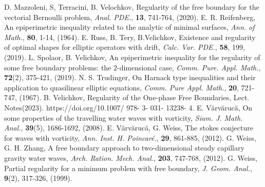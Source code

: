 \documentclass[11pt,reqno]{amsart}
\begin{document}
\begin{thebibliography}{60}
	 D. Mazzoleni, S, Terracini, B. Velochkov, \newblock  Regularity of the free boundary for the vectorial Bernoulli problem, {\it Anal. PDE.}, {\bf 13}, 741-764, (2020).
	 E. R. Reifenberg, \newblock An epiperimetric inequality related to the analytic of minimal surfaces, {\it Ann. of Math.}, {\bf 80}, 1-14, (1964).
	 E. Russ, B. Tery, B.Velichkov, \newblock Existence and regularity of optimal shapes for elliptic operators with drift, {\it Calc. Var. PDE.}, {\bf 58}, 199, (2019).
	 L. Spolaor, B. Velichkov, \newblock An epiperimetric inequality for the regularity of some free boundary problems: the $2$-dimensional case, {\it Comm. Pure. Appl. Math.}, {\bf 72}(2), 375-421, (2019).
	 N. S. Trudinger,  \newblock On Harnack type inequalities and their application to quasilinear elliptic equations, {\it Comm. Pure Appl. Math.}, {\bf 20}, 721-747, (1967).
	 B. Velichkov, \newblock Regularity of the One-phase Free Boundaries, Lect. Notes(2023). https://doi.org/10.1007/ 978- 3- 031- 13238- 4.
	 E.  V\u{a}rv\u{a}ruc\u{a}, \newblock On some properties of the travelling water waves with vorticity, {\it Siam. J. Math. Anal.}, {\bf 39}(5), 1686-1692, (2008). 
	 E. V\u{a}rv\u{a}ruc\u{a}, G. Weiss,   \newblock The stokes conjecture for waves with vorticity, {\it Ann. Inst. H. Poincar\'{e}.}, {\bf 29}, 861-885, (2012).
	 G. Weiss, G. H. Zhang, \newblock A free boundary approach to two-dimensional steady capillary gravity water waves, {\it Arch. Ration. Mech. Anal.}, {\bf 203}, 747-768, (2012).
	 G. Weiss, \newblock Partial regularity for a minimum problem with free boundary, {\it J. Geom. Anal.}, {\bf 9}(2), 317-326, (1999).
\end{thebibliography}
\end{document}
